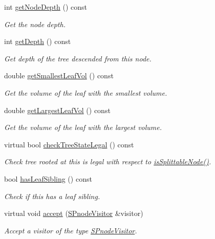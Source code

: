 \begin{DoxyCompactItemize}
int \hyperlink{classsubpavings_1_1SPnode_a07ebbebeb298c88963207afea4be3a81}{get\-Node\-Depth} () const 
\begin{DoxyCompactList}\small\item\em \-Get the node depth. \end{DoxyCompactList}\item 
int \hyperlink{classsubpavings_1_1SPnode_a55f98392efb2d28542610a65a6b00864}{get\-Depth} () const 
\begin{DoxyCompactList}\small\item\em \-Get depth of the tree descended from this node. \end{DoxyCompactList}\item 
double \hyperlink{classsubpavings_1_1SPnode_a91d46ee80958c0bed9fe972cf3cdea2d}{get\-Smallest\-Leaf\-Vol} () const 
\begin{DoxyCompactList}\small\item\em \-Get the volume of the leaf with the smallest volume. \end{DoxyCompactList}\item 
double \hyperlink{classsubpavings_1_1SPnode_a1c60de6474783d65d1603eae6ab9a9ae}{get\-Largest\-Leaf\-Vol} () const 
\begin{DoxyCompactList}\small\item\em \-Get the volume of the leaf with the largest volume. \end{DoxyCompactList}\item 
virtual bool \hyperlink{classsubpavings_1_1SPnode_afde5e15be5259cf61821f175452d165f}{check\-Tree\-State\-Legal} () const 
\begin{DoxyCompactList}\small\item\em \-Check tree rooted at this is legal with respect to \hyperlink{classsubpavings_1_1SPnode_ac3e8e3499bcb0acb42181b781d7796b3}{is\-Splittable\-Node()}. \end{DoxyCompactList}\item 
bool \hyperlink{classsubpavings_1_1SPnode_a0b8af2e1f907279d8a153129aa37aa8e}{has\-Leaf\-Sibling} () const 
\begin{DoxyCompactList}\small\item\em \-Check if this has a leaf sibling. \end{DoxyCompactList}\item 
virtual void \hyperlink{classsubpavings_1_1SPnode_aa075a030c63ffaf0accddc5161852da3}{accept} (\hyperlink{classsubpavings_1_1SPnodeVisitor}{\-S\-Pnode\-Visitor} \&visitor)
\begin{DoxyCompactList}\small\item\em \-Accept a visitor of the type \hyperlink{classsubpavings_1_1SPnodeVisitor}{\-S\-Pnode\-Visitor}. \end{DoxyCompactList}\item 

\end{DoxyCompactItemize}
